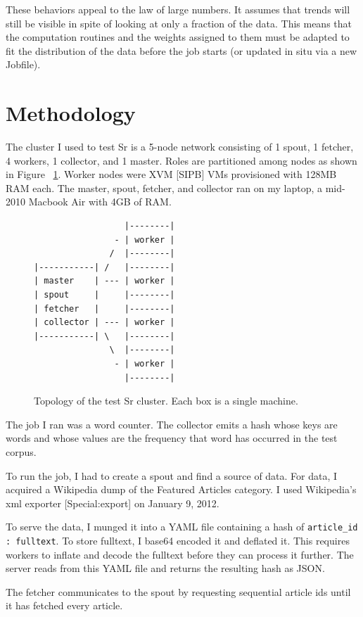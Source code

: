 \documentclass[12pt]{article}
\begin{document}
These behaviors appeal to the law of large numbers. It assumes that trends will still be visible in spite of looking at only a fraction of the data. This means that the computation routines and the weights assigned to them must be adapted to fit the distribution of the data before the job starts (or updated in situ via a new Jobfile).

\section{Methodology}
\label{sec:methodology}
The cluster I used to test Sr is a 5-node network consisting of 1 spout, 1 fetcher, 4 workers, 1 collector, and 1 master. Roles are partitioned among nodes as shown in Figure ~\ref{fig:clusterDiagram}. Worker nodes were XVM [SIPB] VMs provisioned with 128MB RAM each. The master, spout, fetcher, and collector ran on my laptop, a mid-2010 Macbook Air with 4GB of RAM.

\begin{figure}
\begin{verbatim}
                  |--------|
                - | worker |
               /  |--------|
|-----------| /   |--------|
| master    | --- | worker |
| spout     |     |--------|
| fetcher   |     |--------|
| collector | --- | worker |
|-----------| \   |--------|
               \  |--------|
                - | worker |
                  |--------|

\end{verbatim}
\caption{Topology of the test Sr cluster. Each box is a single machine.}
\label{fig:clusterDiagram}
\end{figure}

The job I ran was a word counter. The collector emits a hash whose keys are words and whose values are the frequency that word has occurred in the test corpus.

To run the job, I had to create a spout and find a source of data. For data, I acquired a Wikipedia dump of the Featured Articles category. I used Wikipedia’s xml exporter [Special:export] on January 9, 2012.

To serve the data, I munged it into a YAML file containing a hash of \lstinline[language=Ruby]{article_id : fulltext}. To store fulltext, I base64 encoded it and deflated it. This requires workers to inflate and decode the fulltext before they can process it further. The server reads from this YAML file and returns the resulting hash as JSON.

The fetcher communicates to the spout by requesting sequential article ids until it has fetched every article.
\end{document}
